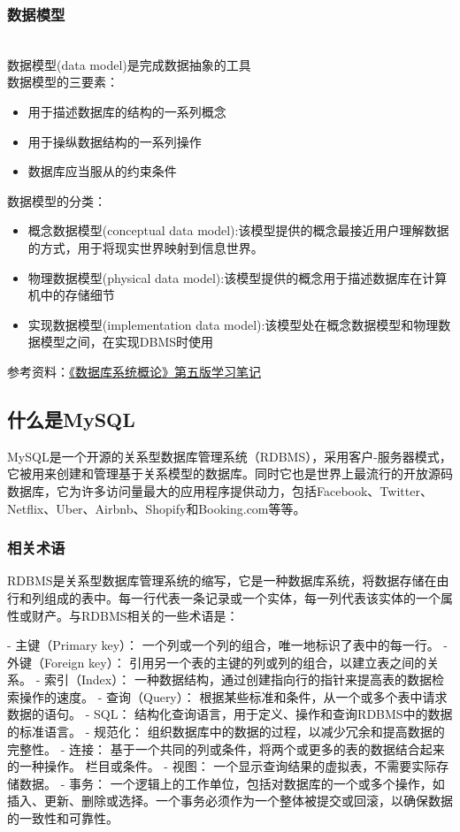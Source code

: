 \subsubsection{数据模型}\\
数据模型(data model)是完成数据抽象的工具 \\
数据模型的三要素：
\begin{itemize}
\item 用于描述数据库的结构的一系列概念
\item 用于操纵数据结构的一系列操作
\item 数据库应当服从的约束条件
\end{itemize}
数据模型的分类：
\begin{itemize}
\item 概念数据模型(conceptual data model):该模型提供的概念最接近用户理解数据的方式，用于将现实世界映射到信息世界。
\item 物理数据模型(physical data model):该模型提供的概念用于描述数据库在计算机中的存储细节
\item 实现数据模型(implementation data model):该模型处在概念数据模型和物理数据模型之间，在实现DBMS时使用
\end{itemize}

参考资料：\href{http://t.csdn.cn/SFcuR}{《数据库系统概论》第五版学习笔记}

\subsection{什么是MySQL}

MySQL是一个开源的关系型数据库管理系统（RDBMS），采用客户-服务器模式，它被用来创建和管理基于关系模型的数据库。同时它也是世界上最流行的开放源码数据库，它为许多访问量最大的应用程序提供动力，包括Facebook、Twitter、Netflix、Uber、Airbnb、Shopify和Booking.com等等。

\subsubsection{相关术语}
RDBMS是关系型数据库管理系统的缩写，它是一种数据库系统，将数据存储在由行和列组成的表中。每一行代表一条记录或一个实体，每一列代表该实体的一个属性或财产。与RDBMS相关的一些术语是：

- 主键（Primary key）： 一个列或一个列的组合，唯一地标识了表中的每一行。
- 外键（Foreign key）： 引用另一个表的主键的列或列的组合，以建立表之间的关系。
- 索引（Index）： 一种数据结构，通过创建指向行的指针来提高表的数据检索操作的速度。
- 查询（Query）： 根据某些标准和条件，从一个或多个表中请求数据的语句。
- SQL： 结构化查询语言，用于定义、操作和查询RDBMS中的数据的标准语言。
- 规范化： 组织数据库中的数据的过程，以减少冗余和提高数据的完整性。
- 连接： 基于一个共同的列或条件，将两个或更多的表的数据结合起来的一种操作。
栏目或条件。
- 视图： 一个显示查询结果的虚拟表，不需要实际存储数据。
- 事务： 一个逻辑上的工作单位，包括对数据库的一个或多个操作，如插入、更新、删除或选择。一个事务必须作为一个整体被提交或回滚，以确保数据的一致性和可靠性。
